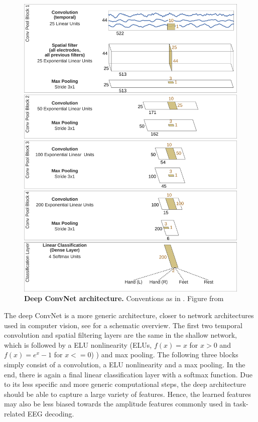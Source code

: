 \begin{figure}[h!tb]
    \myfloatalign
    \includegraphics[width=0.8\linewidth]{images/3D_Diagram_MatplotLib.ipynb.1.png}
    \caption[Deep ConvNet architecture]{
    \textbf{Deep ConvNet architecture.} Conventions as in . Figure from \citet{schirrmeisterdeephbm2017}}\label{deep-net-figure}
\end{figure}

    The deep ConvNet is a more generic architecture, closer to network
architectures used in computer vision, see
 for a schematic overview. The first
two temporal convolution and spatial filtering layers are the same in
the shallow network, which is followed by a ELU nonlinearity (ELUs, $f(x)=x$ for $x > 0$ and $f(x) = e^x-1$ for $x <= 0$) \cite{clevert_fast_2016}) and max pooling. The following
three blocks simply consist of a convolution, a ELU nonlinearity and a
max pooling. In the end, there is again a final linear classification
layer with a softmax function. Due to its less specific and more generic
computational steps, the deep architecture should be able to capture a
large variety of features. Hence, the learned features may also be less
biased towards the amplitude features commonly used in task-related EEG
decoding.


